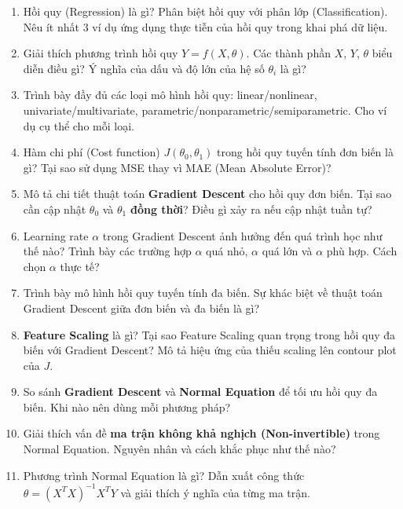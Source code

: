 \documentclass[10pt]{article}
\begin{document}
\begin{enumerate}[leftmargin=*, label=\textbf{Câu \arabic*.}]

    \item Hồi quy (Regression) là gì? Phân biệt hồi quy với phân lớp (Classification). Nêu ít nhất 3 ví dụ ứng dụng thực tiễn của hồi quy trong khai phá dữ liệu.

    \item Giải thích phương trình hồi quy $Y = f(X, \theta)$. Các thành phần $X$, $Y$, $\theta$ biểu diễn điều gì? Ý nghĩa của dấu và độ lớn của hệ số $\theta_i$ là gì?

    \item Trình bày đầy đủ các loại mô hình hồi quy: linear/nonlinear, univariate/multivariate, parametric/nonparametric/semiparametric. Cho ví dụ cụ thể cho mỗi loại.

    \item Hàm chi phí (Cost function) $J(\theta_0, \theta_1)$ trong hồi quy tuyến tính đơn biến là gì? Tại sao sử dụng MSE thay vì MAE (Mean Absolute Error)?

    \item Mô tả chi tiết thuật toán \textbf{Gradient Descent} cho hồi quy đơn biến. Tại sao cần cập nhật $\theta_0$ và $\theta_1$ \textbf{đồng thời}? Điều gì xảy ra nếu cập nhật tuần tự?

    \item Learning rate $\alpha$ trong Gradient Descent ảnh hưởng đến quá trình học như thế nào? Trình bày các trường hợp $\alpha$ quá nhỏ, $\alpha$ quá lớn và $\alpha$ phù hợp. Cách chọn $\alpha$ thực tế?

    \item Trình bày mô hình hồi quy tuyến tính đa biến. Sự khác biệt về thuật toán Gradient Descent giữa đơn biến và đa biến là gì?

    \item \textbf{Feature Scaling} là gì? Tại sao Feature Scaling quan trọng trong hồi quy đa biến với Gradient Descent? Mô tả hiệu ứng của thiếu scaling lên contour plot của $J$.

    \item So sánh \textbf{Gradient Descent} và \textbf{Normal Equation} để tối ưu hồi quy đa biến. Khi nào nên dùng mỗi phương pháp?

    \item Giải thích vấn đề \textbf{ma trận không khả nghịch (Non-invertible)} trong Normal Equation. Nguyên nhân và cách khắc phục như thế nào?

    \item Phương trình Normal Equation là gì? Dẫn xuất công thức $\theta = (X^TX)^{-1}X^TY$ và giải thích ý nghĩa của từng ma trận.


\end{enumerate}
\end{document}
